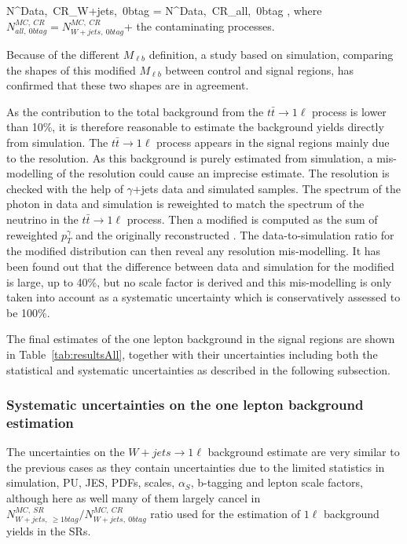 {
N^{Data,~CR}_{W+jets,~0btag} = N^{Data,~CR}_{all,~0btag} \times {} ,
}
where $ N^{MC,~CR}_{all,~0btag} = N^{MC,~CR}_{W+jets,~0btag}$+ the contaminating processes.

Because of the different $M_{\ell b}$ definition, a study based on simulation, comparing the shapes of this modified $M_{\ell b}$ between control and signal regions, has confirmed that these two shapes are in agreement. 

As the contribution to the total background from the $t\bar{t} \to 1\ell$ process is lower than 10\%, it is therefore reasonable to estimate the background yields directly from simulation. The $t\bar{t} \to 1\ell$ process appears in the signal regions mainly due to the \MET resolution. As this background is purely estimated from simulation, a mis-modelling of the \MET resolution could cause an imprecise estimate. The \MET resolution is checked with the help of $\gamma$+jets data and simulated samples. The \pt spectrum of the photon in data and simulation is reweighted to match the \pt spectrum of the neutrino in the $t\bar{t} \to 1\ell$ process. Then a modified \MET is computed as the sum of reweighted $p_{T}^{\gamma}$ and the originally reconstructed \MET. The data-to-simulation ratio for the modified \MET distribution can then reveal any \MET resolution mis-modelling. It has been found out that the difference between data and simulation for the modified \MET is large, up to 40\%, but no scale factor is derived and this mis-modelling is only taken into account as a systematic uncertainty which is conservatively assessed to be 100\%. %
 
The final estimates of the one lepton background in the signal regions are shown in Table~\ref{tab:resultsAll}, together with their uncertainties including both the statistical and systematic uncertainties as described in the following subsection.

\subsubsection{Systematic uncertainties on the one lepton background estimation}

The uncertainties on the $W+jets \to 1\ell$  background estimate are very similar to the previous cases as they contain uncertainties due to the limited statistics in simulation, PU, JES, PDFs, scales, $\alpha_{S}$, b-tagging and lepton scale factors, although here as well many of them largely cancel in $N^{MC,~SR}_{W+jets,~\geq 1btag}/ N^{MC,~CR}_{W+jets,~0btag}$ ratio used for the estimation of $1\ell$ background yields in the SRs.

